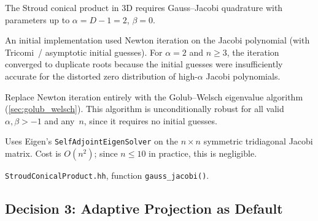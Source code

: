 \begin{description}[leftmargin=0pt,style=nextline]
  \item[Context] The Stroud conical product in 3D requires Gauss--Jacobi
    quadrature with parameters up to $\alpha = D-1 = 2$, $\beta = 0$.

  \item[Problem] An initial implementation used Newton iteration on the
    Jacobi polynomial (with Tricomi~/ asymptotic initial guesses).  For
    $\alpha = 2$ and $n \ge 3$, the iteration converged to duplicate roots
    because the initial guesses were insufficiently accurate for the
    distorted zero distribution of high-$\alpha$ Jacobi polynomials.

  \item[Decision] Replace Newton iteration entirely with the Golub--Welsch
    eigenvalue algorithm (\cref{sec:golub_welsch}).  This algorithm is
    unconditionally robust for all valid $\alpha, \beta > -1$ and any~$n$,
    since it requires no initial guesses.

  \item[Implementation] Uses Eigen's \texttt{SelfAdjointEigenSolver} on the
    $n \times n$ symmetric tridiagonal Jacobi matrix.  Cost is $O(n^2)$;
    since $n \le 10$ in practice, this is negligible.

  \item[Source] \texttt{StroudConicalProduct.hh}, function
    \texttt{gauss\_jacobi()}.
\end{description}


\subsection{Decision 3: Adaptive Projection as Default}
\label{sec:dec_spr}

